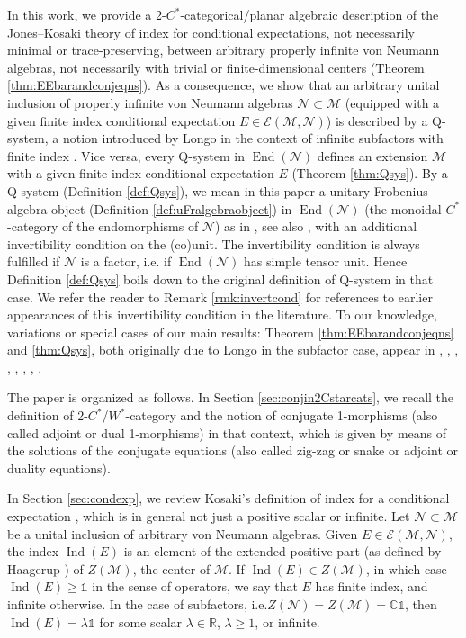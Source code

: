\documentclass[11pt,a4paper]{article}
\makeatletter
\newcommand{\oneop}{\mathds{1}}
\newcommand{\E}{\mathcal{E}}
\newcommand{\M}{\mathcal{M}}
\newcommand{\N}{\mathcal{N}}
\newcommand{\RR}{\mathbb{R}}
\newcommand{\CC}{\mathbb{C}}
\DeclareMathOperator{\End}{End}
\DeclareMathOperator{\Ind}{Ind}
\DeclareRobustCommand{\ie}{i.e.\@\xspace}
\newcommand{\Cstar}{$C^\ast$\@\xspace}
\newcommand{\Wstar}{$W^\ast$\@\xspace}
\theoremstyle{plain}
\theoremstyle{definition}
\theoremstyle{remark}
\numberwithin{equation}{section}%
\makeatother
\begin{document}
In this work, we provide a 2-\Cstar-categorical/planar algebraic description of the Jones--Kosaki theory of index for conditional expectations, not necessarily minimal or trace-preserving, between arbitrary properly infinite von Neumann algebras, not necessarily with trivial or finite-dimensional centers (Theorem \ref{thm:EEbarandconjeqns}). As a consequence, we show that an arbitrary unital inclusion of properly infinite von Neumann algebras $\N\subset\M$ (equipped with a given finite index conditional expectation $E\in\E(\M,\N)$) is described by a Q-system, a notion introduced by Longo in the context of infinite subfactors with finite index \cite{Lon94}. Vice versa, every Q-system in $\End(\N)$ defines an extension $\M$ with a given finite index conditional expectation $E$ (Theorem \ref{thm:Qsys}). By a Q-system (Definition \ref{def:Qsys}), we mean in this paper a unitary Frobenius algebra object (Definition \ref{def:uFralgebraobject}) in $\End(\N)$ (the monoidal \Cstar-category of the endomorphisms of $\N$) as in \cite{Lon94}, see also \cite{LoRo97}, with an additional invertibility condition on the (co)unit. The invertibility condition is always fulfilled if $\N$ is a factor, \ie if $\End(\N)$ has simple tensor unit. Hence Definition \ref{def:Qsys} boils down to the original definition of Q-system in that case. We refer the reader to Remark \ref{rmk:invertcond} for references to earlier appearances of this invertibility condition in the literature. 
To our knowledge, variations or special cases of our main results: Theorem \ref{thm:EEbarandconjeqns} and \ref{thm:Qsys}, both originally due to Longo in the subfactor case, appear in \cite{Lon90}, \cite{Lon94}, \cite{FiIs95}, \cite{Mue03-I}, \cite{BDH14}, \cite{BKLR15}, \cite{GiYu20}, \cite{CHPJP21}.

The paper is organized as follows. In Section \ref{sec:conjin2Cstarcats}, we recall the definition of 2-\Cstar/\Wstar-category and the notion of conjugate 1-morphisms (also called adjoint or dual 1-morphisms) in that context, which is given by means of the solutions of the conjugate equations \cite{LoRo97} (also called zig-zag or snake or adjoint or duality equations).

In Section \ref{sec:condexp}, we review Kosaki's definition of index for a conditional expectation \cite{Kos86}, which is in general not just a positive scalar or infinite. Let $\N\subset\M$ be a unital inclusion of arbitrary von Neumann algebras. Given $E\in\E(\M,\N)$, the index $\Ind(E)$ is an element of the extended positive part (as defined by Haagerup \cite{Haa79I}) of $Z(\M)$, the center of $\M$. If $\Ind(E)\in Z(\M)$, in which case $\Ind(E)\geq \oneop$ in the sense of operators, we say that $E$ has finite index, and infinite otherwise.
In the case of subfactors, \ie $Z(\N) = Z(\M) = \CC\oneop$, then $\Ind(E) = \lambda \oneop$ for some scalar $\lambda\in\RR$, $\lambda \geq 1$, or infinite. 
\end{document}

